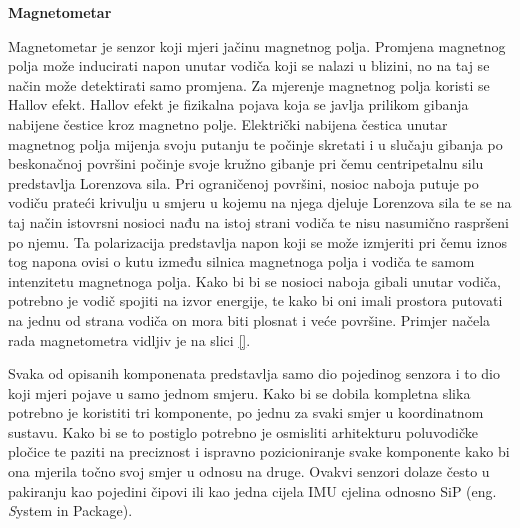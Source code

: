 \documentclass[times, utf8, diplomski]{fer}
\begin{document}
\textbf{Magnetometar}

Magnetometar je senzor koji mjeri jačinu magnetnog polja. Promjena magnetnog polja može
inducirati napon unutar vodiča koji se nalazi u blizini, no na taj se način može detektirati samo promjena. Za mjerenje magnetnog
polja koristi se Hallov efekt. Hallov efekt je fizikalna pojava koja se javlja prilikom gibanja nabijene čestice kroz magnetno polje.
Električki nabijena čestica unutar magnetnog polja mijenja svoju putanju te počinje skretati i u slučaju gibanja po beskonačnoj
površini počinje svoje kružno gibanje pri čemu centripetalnu silu predstavlja Lorenzova sila. Pri ograničenoj površini, nosioc
naboja putuje po vodiču prateći krivulju u smjeru u kojemu na njega djeluje Lorenzova sila te se na taj način istovrsni nosioci
nađu na istoj strani vodiča te nisu nasumično raspršeni po njemu. Ta polarizacija predstavlja napon koji se može izmjeriti pri
čemu iznos tog napona ovisi o kutu između silnica magnetnoga polja i vodiča te samom intenzitetu magnetnoga polja. Kako bi bi se 
nosioci naboja gibali unutar vodiča, potrebno je vodič spojiti na izvor energije, te kako bi oni imali prostora putovati na 
jednu od strana vodiča on mora biti plosnat i veće površine. Primjer načela rada magnetometra vidljiv je na slici \ref{}.


Svaka od opisanih komponenata predstavlja samo dio pojedinog senzora i to dio koji mjeri pojave u samo jednom smjeru. Kako bi se
dobila kompletna slika potrebno je koristiti tri komponente, po jednu za svaki smjer u koordinatnom sustavu. Kako bi se to postiglo
potrebno je osmisliti arhitekturu poluvodičke pločice te paziti na preciznost i ispravno pozicioniranje svake komponente kako bi
ona mjerila točno svoj smjer u odnosu na druge. Ovakvi senzori dolaze često u pakiranju kao pojedini čipovi ili kao jedna cijela
IMU cjelina odnosno SiP (eng. \textit System in Package).
\end{document}
